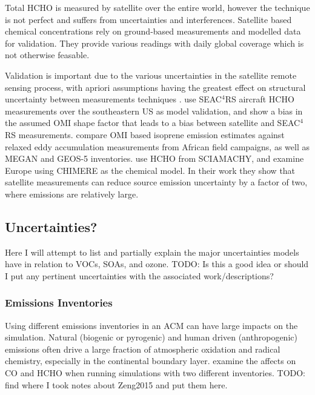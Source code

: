   Total HCHO is measured by satellite over the entire world, however the technique is not perfect and suffers from uncertainties and interferences.
  Satellite based chemical concentrations rely on ground-based measurements and modelled data for validation.
  They provide various readings with daily global coverage which is not otherwise feasable.
  
  Validation is important due to the various uncertainties in the satellite remote sensing process, with apriori assumptions having the greatest effect on structural uncertainty between measurements techniques \cite{Lorente2017}.
  \cite{Zhu2016} use SEAC$^4$RS aircraft HCHO measurements over the southeastern US as model validation, and show a bias in the assumed OMI shape factor that leads to a bias between satellite and SEAC$^4$RS measurements.
  \cite{Marais2014} compare OMI based isoprene emission estimates against relaxed eddy accumulation measurements from African field campaigns, as well as MEGAN and GEOS-5 inventories.
  \cite{Dufour2009} use HCHO from SCIAMACHY, and examine Europe using CHIMERE as the chemical model. 
  In their work they show that satellite measurements can reduce source emission uncertainty by a factor of two, where emissions are relatively large.
  
  
  \subsection{Uncertainties?}
  \label{LR:Models:Uncert}
    
    Here I will attempt to list and partially explain the major uncertainties models have in relation to  VOCs, SOAs, and ozone. 
    TODO: Is this a good idea or should I put any pertinent uncertainties with the associated work/descriptions?
    
    
    \subsubsection{Emissions Inventories}
      Using different emissions inventories in an ACM can have large impacts on the simulation.
      Natural (biogenic or pyrogenic) and human driven (anthropogenic) emissions often drive a large fraction of atmospheric oxidation and radical chemistry, especially in the continental boundary layer.
      \cite{Zeng2015} examine the affects on CO and HCHO when running simulations with two different inventories.
      TODO: find where I took notes about Zeng2015 and put them here.
      

